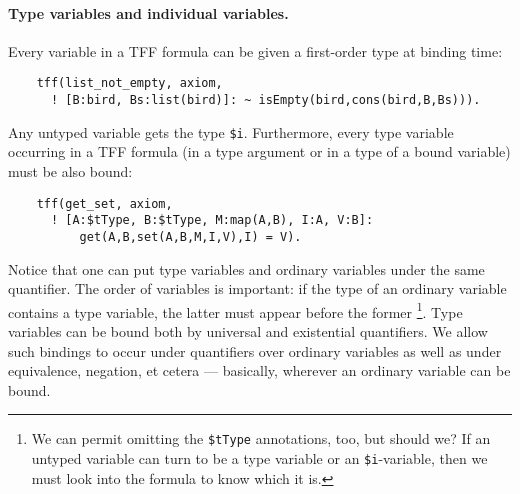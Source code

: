 \paragraph{Type variables and individual variables.}
Every variable in a TFF formula can be given a first-order type
at binding time:
\begin{verbatim}
    tff(list_not_empty, axiom,
      ! [B:bird, Bs:list(bird)]: ~ isEmpty(bird,cons(bird,B,Bs))).
\end{verbatim}
Any untyped variable gets the type \verb+$i+.
Furthermore, every type variable occurring in a TFF formula
(in a type argument or in a type of a bound variable)
must be also bound:
\begin{verbatim}
    tff(get_set, axiom,
      ! [A:$tType, B:$tType, M:map(A,B), I:A, V:B]:
          get(A,B,set(A,B,M,I,V),I) = V).
\end{verbatim}
Notice that one can put type variables and ordinary variables
under the same quantifier. The order of variables is important:
if the type of an ordinary variable contains a type variable,
the latter must appear before the former%
\footnote{We can permit omitting the {\tt\$tType} annotations,
too, but should we? If an untyped variable can turn to be
a type variable or an {\tt\$i}-variable, then we must look
into the formula to know which it is.}.
Type variables can be bound both by universal and existential
quantifiers.
We allow such bindings to occur under quantifiers over ordinary
variables as well as under equivalence, negation, et cetera ---
basically, wherever an ordinary variable can be bound.

